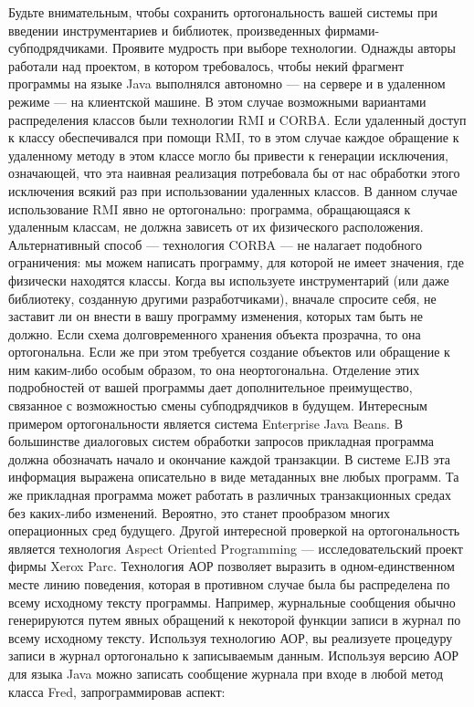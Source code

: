 Будьте внимательным, чтобы сохранить ортогональность вашей системы при введении
инструментариев и библиотек, произведенных фирмами-субподрядчиками. Проявите
мудрость при выборе технологии. Однажды авторы работали над проектом, в котором
требовалось, чтобы некий фрагмент программы на языке Java выполнялся автономно —
на сервере и в удаленном режиме — на клиентской машине. В этом случае возможными
вариантами распределения классов были технологии RMI и CORBA. Если удаленный
доступ к классу обеспечивался при помощи RMI, то в этом случае каждое обращение
к удаленному методу в этом классе могло бы привести к генерации исключения,
означающей, что эта наивная реализация потребовала бы от нас обработки этого
исключения всякий раз при использовании удаленных классов. В данном случае
использование RMI явно не ортогонально: программа, обращающаяся к удаленным
классам, не должна зависеть от их физического расположения. Альтернативный
способ — технология CORBA — не налагает подобного ограничения: мы можем написать
программу, для которой не имеет значения, где физически находятся классы. Когда
вы используете инструментарий (или даже библиотеку, созданную другими
разработчиками), вначале спросите себя, не заставит ли он внести в вашу
программу изменения, которых там быть не должно. Если схема долговременного
хранения объекта прозрачна, то она ортогональна. Если же при этом требуется
создание объектов или обращение к ним каким-либо особым образом, то она
неортогональна. Отделение этих подробностей от вашей программы дает
дополнительное преимущество, связанное с возможностью смены субподрядчиков в
будущем. Интересным примером ортогональности является система Enterprise Java
Beans. В большинстве диалоговых систем обработки запросов прикладная программа
должна обозначать начало и окончание каждой транзакции. В системе EJB эта
информация выражена описательно в виде метаданных вне любых программ. Та же
прикладная программа может работать в различных транзакционных средах без
каких-либо изменений. Вероятно, это станет прообразом многих операционных сред
будущего. Другой интересной проверкой на ортогональность является технология
Aspect Oriented Programming — исследовательский проект фирмы Xerox Parc.
Технология АОР позволяет выразить в одном-единственном месте линию поведения,
которая в противном случае была бы распределена по всему исходному тексту
программы. Например, журнальные сообщения обычно генерируются путем явных
обращений к некоторой функции записи в журнал по всему исходному тексту.
Используя технологию АОР, вы реализуете процедуру записи в журнал ортогонально к
записываемым данным. Используя версию АОР для языка Java можно записать
сообщение журнала при входе в любой метод класса Fred, запрограммировав аспект:

